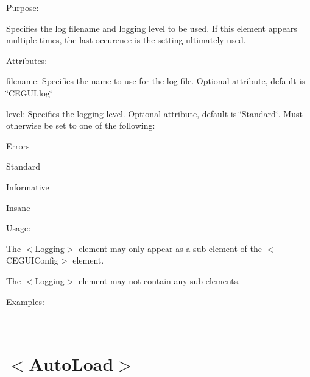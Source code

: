 \begin{DoxyItemize}
\item Purpose\+:
\begin{DoxyItemize}
\item Specifies the log filename and logging level to be used. If this element appears multiple times, the last occurence is the setting ultimately used.
\end{DoxyItemize}
\item Attributes\+:
\begin{DoxyItemize}
\item {\ttfamily filename\+:} Specifies the name to use for the log file. Optional attribute, default is \char`\"{}\+C\+E\+G\+U\+I.\+log\char`\"{}
\item {\ttfamily level\+:} Specifies the logging level. Optional attribute, default is \char`\"{}\+Standard\char`\"{}. Must otherwise be set to one of the following\+:
\begin{DoxyItemize}
\item Errors
\item Standard
\item Informative
\item Insane
\end{DoxyItemize}
\end{DoxyItemize}
\item Usage\+:
\begin{DoxyItemize}
\item The $<$Logging$>$ element may only appear as a sub-\/element of the $<$C\+E\+G\+U\+I\+Config$>$ element.
\item The $<$Logging$>$ element may not contain any sub-\/elements.
\end{DoxyItemize}
\item Examples\+:
\end{DoxyItemize}

~\newline
 \hypertarget{xml_config_xml_config_autoload}{}\section{$<$\+Auto\+Load$>$}\label{xml_config_xml_config_autoload}

